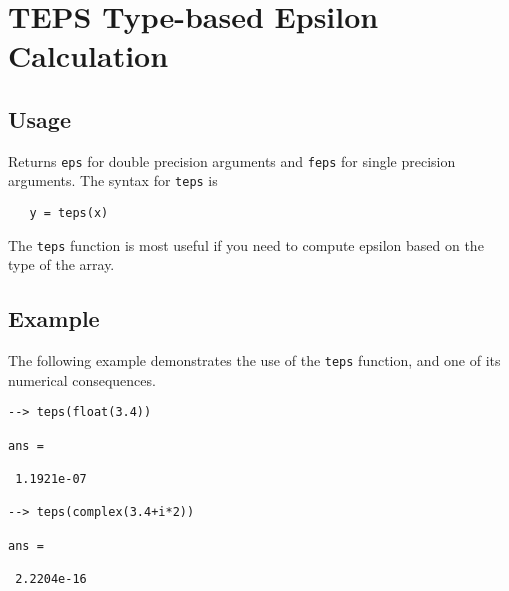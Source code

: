 \section{TEPS Type-based Epsilon Calculation}

\subsection{Usage}

Returns \verb|eps| for double precision arguments and
\verb|feps| for single precision arguments.  The syntax for
\verb|teps| is
\begin{verbatim}
   y = teps(x)
\end{verbatim}
The \verb|teps| function is most useful if you need to
compute epsilon based on the type of the array.
\subsection{Example}

The following example demonstrates the use of the \verb|teps| function,
and one of its numerical consequences.
\begin{verbatim}
--> teps(float(3.4))

ans = 

 1.1921e-07 

--> teps(complex(3.4+i*2))

ans = 

 2.2204e-16 
\end{verbatim}

